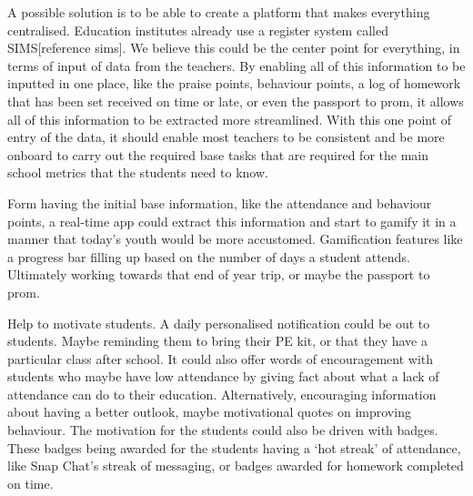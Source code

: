 \documentclass{sigchi}
\begin{document}
A possible solution is to be able to create a platform that makes everything centralised. Education institutes already use a register system called SIMS[reference sims]. We believe this could be the center point for everything, in terms of input of data from the teachers. By enabling all of this information to be inputted in one place, like the praise points, behaviour points, a log of homework that has been set received on time or late, or even the passport to prom, it allows all of this information to be extracted more streamlined. With this one point of entry of the data, it should enable most teachers to be consistent and be more onboard to carry out the required base tasks that are required for the main school metrics that the students need to know.

Form having the initial base information, like the attendance and behaviour points, a real-time app could extract this information and start to gamify it in a manner that today’s youth would be more accustomed. Gamification features like a progress bar filling up based on the number of days a student attends. Ultimately working towards that end of year trip, or maybe the passport to prom.

Help to motivate students. A daily personalised notification could be out to students. Maybe reminding them to bring their PE kit, or that they have a particular class after school. It could also offer words of encouragement with students who maybe have low attendance by giving fact about what a lack of attendance can do to their education. Alternatively, encouraging information about having a better outlook, maybe motivational quotes on improving behaviour. The motivation for the students could also be driven with badges. These badges being awarded for the students having a ‘hot streak’ of attendance, like Snap Chat’s streak of messaging, or badges awarded for homework completed on time.
\end{document}
